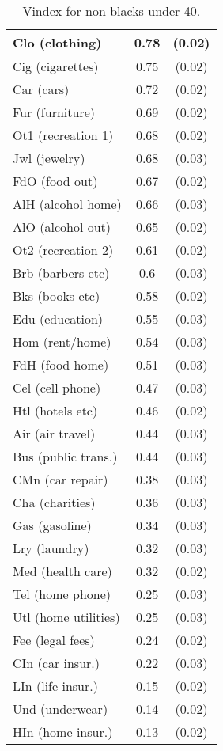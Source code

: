 \documentclass{article}
\begin{document}
\begin{wraptable}{l}{6cm}
\begin{tabular}{|l|c|c|}
	\hline
Clo (clothing) & 0.78 & (0.02)\\ 
	\hline
Cig (cigarettes) & 0.75 & (0.02)\\ 
	\hline
Car (cars) & 0.72 & (0.02)\\ 
	\hline
Fur (furniture) & 0.69 & (0.02)\\ 
	\hline
Ot1 (recreation 1) & 0.68 & (0.02)\\ 
	\hline
Jwl (jewelry) & 0.68 & (0.03)\\ 
	\hline
FdO (food out) & 0.67 & (0.02)\\ 
	\hline
AlH (alcohol home) & 0.66 & (0.03)\\ 
	\hline
AlO (alcohol out) & 0.65 & (0.02)\\ 
	\hline
Ot2 (recreation 2) & 0.61 & (0.02)\\ 
	\hline
Brb (barbers etc) & 0.6 & (0.03)\\ 
	\hline
Bks (books etc) & 0.58 & (0.02)\\ 
	\hline
Edu (education) & 0.55 & (0.03)\\ 
	\hline
Hom (rent/home) & 0.54 & (0.03)\\ 
	\hline
FdH (food home) & 0.51 & (0.03)\\ 
	\hline
Cel (cell phone) & 0.47 & (0.03)\\ 
	\hline
Htl (hotels etc) & 0.46 & (0.02)\\ 
	\hline
Air (air travel) & 0.44 & (0.03)\\ 
	\hline
Bus (public trans.) & 0.44 & (0.03)\\ 
	\hline
CMn (car repair) & 0.38 & (0.03)\\ 
	\hline
Cha (charities) & 0.36 & (0.03)\\ 
	\hline
Gas (gasoline) & 0.34 & (0.03)\\ 
	\hline
Lry (laundry) & 0.32 & (0.03)\\ 
	\hline
Med (health care) & 0.32 & (0.02)\\ 
	\hline
Tel (home phone) & 0.25 & (0.03)\\ 
	\hline
Utl (home utilities) & 0.25 & (0.03)\\ 
	\hline
Fee (legal fees) & 0.24 & (0.02)\\ 
	\hline
CIn (car insur.) & 0.22 & (0.03)\\ 
	\hline
LIn (life insur.) & 0.15 & (0.02)\\ 
	\hline
Und (underwear) & 0.14 & (0.02)\\ 
	\hline
HIn (home insur.) & 0.13 & (0.02)\\ 
	\hline
\end{tabular}
\label{tab:vintab}
\caption{Vindex for non-blacks under 40.}
\vspace{-2in}
\end{wraptable}
\end{document}
